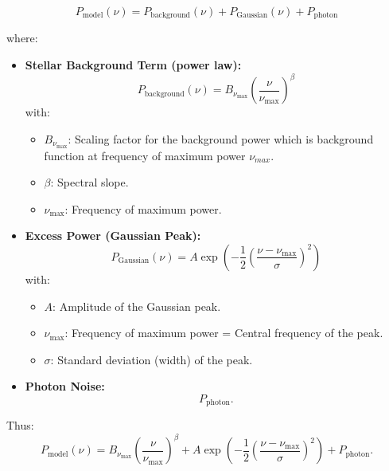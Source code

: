\documentclass[12pt]{article}
\begin{document}
\begin{equation}
    P_{\text{model}}(\nu) = P_{\text{background}}(\nu) + P_{\text{Gaussian}}(\nu) + P_{\text{photon}}
\end{equation}

where:
\begin{itemize}
    \item \textbf{Stellar Background Term (power law):}
    \begin{equation}
        P_{\text{background}}(\nu) = B_{\nu_{\text{max}}} \left( \frac{\nu}{\nu_{\text{max}}} \right)^{\beta}
    \end{equation}
    with:
    \begin{itemize}
        \item $B_{\nu_{\text{max}}}$: Scaling factor for the background power which is background function at frequency of maximum power $\nu_{max}$.
        \item $\beta$: Spectral slope.
        \item $\nu_{\text{max}}$: Frequency of maximum power.
    \end{itemize}

    \item \textbf{Excess Power (Gaussian Peak):}
    \begin{equation}
        P_{\text{Gaussian}}(\nu) = A \exp\left(-\frac{1}{2} \left( \frac{\nu - \nu_{\text{max}}}{\sigma} \right)^2 \right)
    \end{equation}
    with:
    \begin{itemize}
        \item $A$: Amplitude of the Gaussian peak.
        \item $\nu_{\text{max}}$: Frequency of maximum power = Central frequency of the peak.
        \item $\sigma$: Standard deviation (width) of the peak.
    \end{itemize}

    \item \textbf{Photon Noise:}
    \[
    P_{\text{photon}}.
    \]
\end{itemize}

Thus:
\begin{equation}\label{eq:modelP}
    P_{\text{model}}(\nu) = B_{\nu_{\text{max}}} \left( \frac{\nu}{\nu_{\text{max}}} \right)^{\beta} + A \exp\left(-\frac{1}{2} \left( \frac{\nu - \nu_{\text{max}}}{\sigma} \right)^2 \right) + P_{\text{photon}}.
\end{equation}
\end{document}
